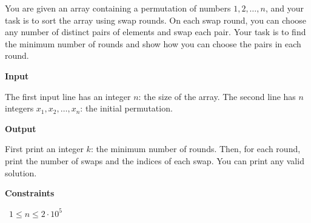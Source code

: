 You are given an array containing a permutation of numbers $1,2,\dots,n$, and your task is to sort the array using swap rounds. On each swap round, you can choose any number of distinct pairs of elements and swap each pair.
Your task is to find the minimum number of rounds and show how you can choose the pairs in each round.

\vspace{0.3cm}\noindent\textbf{Input}

The first input line has an integer $n$: the size of the array.
The second line has $n$ integers $x_1,x_2,\dots,x_n$: the initial permutation.

\vspace{0.3cm}\noindent\textbf{Output}

First print an integer $k$: the minimum number of rounds.
Then, for each round, print the number of swaps and the indices of each swap. You can print any valid solution.

\vspace{0.3cm}\noindent\textbf{Constraints}

\textbullet\ $1 \le n \le 2 \cdot 10^5$